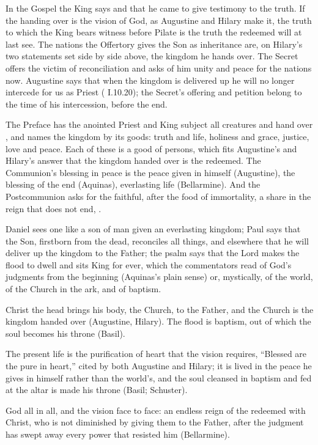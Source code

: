 In the Gospel the King says  and that he came
to give testimony to the truth. If the handing over is the vision of God, as
Augustine and Hilary make it, the truth to which the King bears witness before
Pilate is the truth the redeemed will at last see. The nations the Offertory
gives the Son as inheritance are, on Hilary's two statements set side by side
above, the kingdom he hands over. The Secret offers the victim of
reconciliation and asks of him unity and peace for the nations now. Augustine
says that when the kingdom is delivered up he will no longer intercede for us
as Priest ( I.10.20); the Secret's offering and petition
belong to the time of his intercession, before the end.

The Preface has the anointed Priest and King subject all creatures and hand
over , and names the kingdom by its goods:
truth and life, holiness and grace, justice, love and peace. Each of these is
a good of persons, which fits Augustine's and Hilary's answer that the kingdom
handed over is the redeemed. The Communion's blessing in peace is the peace
given in himself (Augustine), the blessing of the end (Aquinas), everlasting
life (Bellarmine). And the Postcommunion asks for the faithful, after the food
of immortality, a share in the reign that does not end, .

\begin{fourSenses}
\item[Literal.] Daniel sees one like a son of man given an everlasting
kingdom; Paul says that the Son, firstborn from the dead, reconciles all
things, and elsewhere that he will deliver up the kingdom to the Father; the
psalm says that the Lord makes the flood to dwell and sits King for ever,
which the commentators read of God's judgments from the beginning (Aquinas's
plain sense) or, mystically, of the world, of the Church in the ark, and of
baptism.
\item[Allegorical.] Christ the head brings his body, the Church, to the
Father, and the Church is the kingdom handed over (Augustine, Hilary). The
flood is baptism, out of which the soul becomes his throne (Basil).
\item[Moral.] The present life is the purification of heart that the vision
requires, ``Blessed are the pure in heart,'' cited by both Augustine and
Hilary; it is lived in the peace he gives in himself rather than the world's,
and the soul cleansed in baptism and fed at the altar is made his throne
(Basil; Schuster).
\item[Anagogical.] God all in all, and the vision face to face: an endless
reign of the redeemed with Christ, who is not diminished by giving them to the
Father, after the judgment has swept away every power that resisted him
(Bellarmine).
\end{fourSenses}

